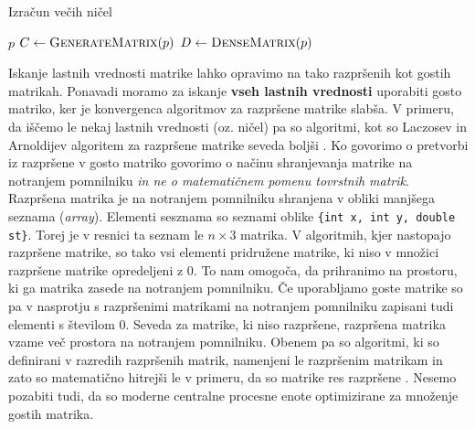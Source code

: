 \begin{algorithm}[H]
\caption{Izračun večih ničel}
\begin{algorithmic}
\Require $p$
    \State $C \gets \Call{GenerateMatrix}{p}$ 
    \State $D \gets \Call{DenseMatrix}{p}$ 
\Return {} 
    
\end{algorithmic}
\end{algorithm}
Iskanje lastnih vrednosti matrike lahko opravimo na tako razpršenih kot gostih matrikah. Ponavadi moramo za iskanje \textbf{vseh lastnih vrednosti} uporabiti gosto matriko, ker je konvergenca algoritmov za razpršene matrike slabša. V primeru, da iščemo le nekaj lastnih vrednosti (oz. ničel) pa so algoritmi, kot so Laczosev in Arnoldijev algoritem za razpršene matrike seveda boljši \cite{Plestenjak2021}. Ko govorimo o pretvorbi iz razpršene v gosto matriko govorimo o načinu shranjevanja matrike na notranjem pomnilniku \textit{in ne o matematičnem pomenu tovrstnih matrik}. Razpršena matrika je na notranjem pomnilniku shranjena v obliki manjšega seznama (\textit{array}). Elementi sesznama so seznami oblike \texttt{\{int x, int y, double st\}}. Torej je v resnici ta seznam le $n \times 3$ matrika. V algoritmih, kjer nastopajo razpršene matrike, so tako vsi elementi pridružene matrike, ki niso v množici razpršene matrike opredeljeni z 0. To nam omogoča, da prihranimo na prostoru, ki ga matrika zasede na notranjem pomnilniku. Če uporabljamo goste matrike so pa v nasprotju s razpršenimi matrikami na notranjem pomnilniku zapisani tudi elementi s številom 0. Seveda za matrike, ki niso razpršene, razpršena matrika vzame več prostora na notranjem pomnilniku. Obenem pa so algoritmi, ki so definirani v razredih razpršenih matrik, namenjeni le razpršenim matrikam in zato so matematično hitrejši le v primeru, da so matrike res razpršene \cite{sparsem}. Nesemo pozabiti tudi, da so moderne centralne procesne enote optimizirane za množenje gostih matrika.
